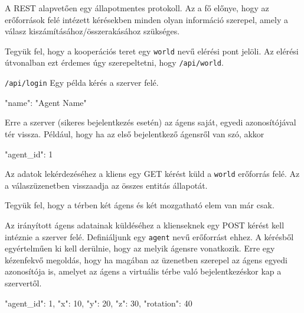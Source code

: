 


A REST alapvetően egy állapotmentes protokoll.
Az a fő előnye, hogy az erőforrások felé intézett kérésekben minden olyan információ szerepel, amely a válasz kiszámításához/összerakásához szükséges.

Tegyük fel, hogy a kooperációs teret egy \texttt{world} nevű elérési pont jelöli.
Az elérési útvonalban ezt érdemes úgy szerepeltetni, hogy \texttt{/api/world}.


\texttt{/api/login}
Egy példa kérés a szerver felé.
\begin{python}
{ "name": "Agent Name" }
\end{python}
Erre a szerver (sikeres bejelentkezés esetén) az ágens saját, egyedi azonosítójával tér vissza.
Például, hogy ha az első bejelentkező ágensről van szó, akkor
\begin{python}
{ "agent_id": 1 }
\end{python}



Az adatok lekérdezéséhez a kliens egy GET kérést küld a \texttt{world} erőforrás felé.
Az a válaszüzenetben visszaadja az összes entitás állapotát.

Tegyük fel, hogy a térben két ágens és két mozgatható elem van már csak.



Az irányított ágens adatainak küldéséhez a klienseknek egy POST kérést kell intéznie a szerver felé.
Definiáljunk egy \texttt{agent} nevű erőforrást ehhez.
A kérésből egyértelműen ki kell derülnie, hogy az melyik ágensre vonatkozik.
Erre egy kézenfekvő megoldás, hogy ha magában az üzenetben szerepel az ágens egyedi azonosítója is, amelyet az ágens a virtuális térbe való bejelentkezéskor kap a szervertől.


\begin{python}
{
  "agent_id": 1,
  "x": 10, "y": 20, "z": 30,
  "rotation": 40
}
\end{python}

